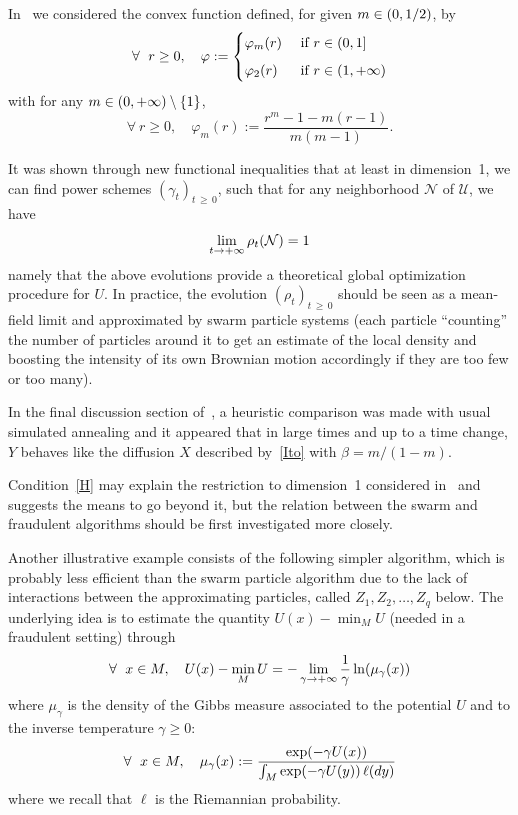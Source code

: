 \documentclass[AHL,Unicode,longabstracts,published]{cedram}
\newcommand{\f}[2]{\frac{#1}{#2}}
\newcommand{\cN}{\mathcal{N}}
\newcommand{\cU}{\mathcal{U}}
\newcommand{\iy}{\infty}
\newcommand{\fo}{\forall\ }
\let\oldin\in
\renewcommand{\in}{\mathchoice{\oldin}{\oldin}{\,\oldin\,}{\,\oldin\,}}
\renewcommand*{\to}{\mathchoice{\longrightarrow}{\rightarrow}{\rightarrow}{\rightarrow}}
\let\oldforall\forall
\renewcommand*{\forall}{\mathrel{\oldforall}}
\begin{document}
In~\cite{https://doi.org/10.48550/arxiv.2204.01306} we considered the convex function defined, for given $m\in(0,1/2)$, by
\begin{equation*}
\fo r\geq 0,\quad
\varphi :=
\begin{cases}
\varphi_{m}(r)&\text{ if }r\in(0,1]\\[2mm]
\varphi_{2}(r)&\text{ if }r\in(1,+\iy)
\end{cases}
\end{equation*}
with for any $m\in(0,+\iy)\setminus\{1\}$,
\begin{equation*}
\fo r\geq 0,\quad
\varphi_m(r) := 
\f{r^m-1-m(r-1)}{m(m-1)}.
\end{equation*}


It was shown through new functional inequalities that at least in dimension~1, we can find power schemes $(\gamma_t)_{t\,\geq\,0}$, such that for any neighborhood $\cN$ of $\cU$, we have
\begin{equation*}
\lim_{t\to +\iy} \rho_t(\cN) = 1
\end{equation*}
namely that the above evolutions provide a theoretical global optimization procedure for $U$. In practice, the evolution $(\rho_t)_{t\,\geq\,0}$ should be seen as a mean-field limit and approximated by swarm particle systems (each particle ``counting'' the number of particles around it to get an estimate of the local density and boosting the intensity of its own Brownian motion accordingly if they are too few or too many).


In the final discussion section of~\cite{https://doi.org/10.48550/arxiv.2204.01306}, a heuristic comparison was made with usual simulated annealing and it appeared that in large times and up to a time change, $Y$ behaves like the diffusion $X$ described by~\eqref{Ito} with $\beta=m/(1-m)$.


Condition~\eqref{H} may explain the restriction to dimension~1 considered in~\cite{https://doi.org/10.48550/arxiv.2204.01306} and suggests the means to go beyond it, but the relation between the swarm and fraudulent algorithms should be first investigated more closely.

Another illustrative example consists of the following simpler algorithm, which is probably less efficient than the swarm particle algorithm due to the lack of interactions between the approximating particles, called $Z_1, Z_2,\dots, Z_q$ below. The underlying idea is to estimate the quantity $U(x)-\min_MU$ (needed in a fraudulent setting) through
\begin{equation}\label{appmin}
\fo x\in M,\quad U(x)-\min_MU = -\lim_{\gamma\to +\iy} \f1\gamma\ln(\mu_\gamma(x))
\end{equation}
where $\mu_\gamma$ is the density of the Gibbs measure associated to the potential $U$ and to the inverse temperature $\gamma\geq 0$:
\begin{equation*}
\fo x\in M,\quad \mu_\gamma(x) := \f{\exp(-\gamma U(x))}{\int_M \exp(-\gamma U(y))\, \ell(dy)}
\end{equation*}
where we recall that $\ell$ is the Riemannian probability.
\end{document}
